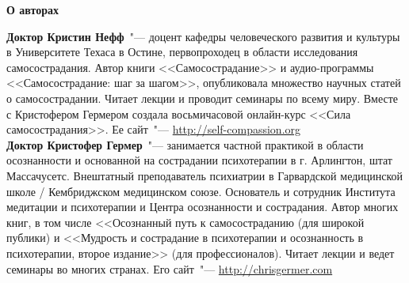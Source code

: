 
{\bf \Huge О авторах\\[2cm]}

{\bf Доктор Кристин Нефф}~"--- доцент кафедры человеческого развития и культуры в Университете Техаса в Остине, первопроходец в области исследования самосострадания. Автор книги <<Самосострадание>> и аудио-программы <<Самосострадание: шаг за шагом>>, опубликовала множество научных статей о самосострадании. Читает лекции и проводит семинары по всему миру. Вместе с Кристофером Гермером создала восьмичасовой онлайн-курс <<Сила самосострадания>>. Ее сайт~"--- \url{http://self-compassion.org}\\
	
{\bf Доктор Кристофер Гермер}~"--- занимается частной практикой в области осознанности и основанной на сострадании психотерапии в г. Арлингтон, штат Массачусетс. Внештатный преподаватель психиатрии в Гарвардской медицинской школе / Кембриджском медицинском союзе. Основатель и сотрудник Института медитации и психотерапии и Центра осознанности и сострадания. Автор многих книг, в том числе <<Осознанный путь к самосостраданию (для широкой публики) и <<Мудрость и сострадание в психотерапии и осознанность в психотерапии, второе издание>> (для профессионалов). Читает лекции и ведет семинары во многих странах. Его сайт~"--- \url{http://chrisgermer.com}
	